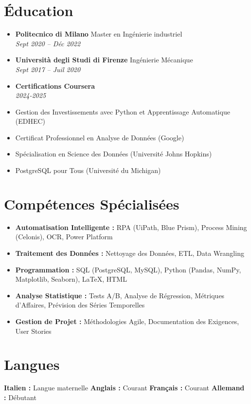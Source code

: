 \documentclass[letterpaper,10.5pt]{article}
\newcommand{\resumeEntry}[4]{
  \item\textbf{#1} \hfill #2\\
  \textit{#3} \hfill \textit{#4}
}
\begin{document}
\section*{Éducation}
\begin{itemize}[leftmargin=0.2in]
    \resumeEntry{Politecnico di Milano}{Master en Ingénierie industriel}{Sept 2020 -- Déc 2022}{}
    \resumeEntry{Università degli Studi di Firenze}{Ingénierie Mécanique}{Sept 2017 -- Juil 2020}{}
    \resumeEntry{Certifications Coursera}{}{2024-2025}{}
\end{itemize}
\begin{multicols}{2}
    \small
    \begin{itemize}[leftmargin=0.4 in, label={-}]
        \item Gestion des Investissements avec Python et Apprentissage Automatique (EDHEC)
        \item Certificat Professionnel en Analyse de Données (Google)
    \end{itemize}
    \begin{itemize}[leftmargin=0.3 in, label={-}]
        \item Spécialisation en Science des Données (Université Johns Hopkins)
        \item PostgreSQL pour Tous (Université du Michigan)
    \end{itemize}
\end{multicols}

\section*{Compétences Spécialisées}\vspace{-15pt}
\begin{multicols}{2}
\begin{itemize}[leftmargin=0.2in]
    \item \textbf{Automatisation Intelligente :} RPA (UiPath, Blue Prism), Process Mining (Celonis), OCR, Power Platform
    \item \textbf{Traitement des Données :} Nettoyage des Données, ETL, Data Wrangling
    \item \textbf{Programmation :} SQL (PostgreSQL, MySQL), Python (Pandas, NumPy, Matplotlib, Seaborn), LaTeX, HTML
    \item \textbf{Analyse Statistique :} Tests A/B, Analyse de Régression, Métriques d'Affaires, Prévision des Séries Temporelles
    \item \textbf{Gestion de Projet :} Méthodologies Agile, Documentation des Exigences, User Stories
\end{itemize}
\end{multicols}

\section*{Langues}\vspace{-5pt}
\textbf{Italien :} Langue maternelle \hspace{20pt} \textbf{Anglais :} Courant \hspace{20pt} \textbf{Français :} Courant \hspace{20pt} \textbf{Allemand :} Débutant
\end{document}
